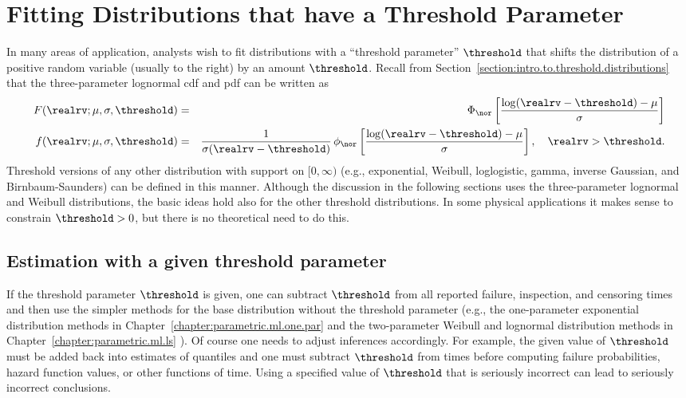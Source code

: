 \section{Fitting Distributions that have a Threshold Parameter}
\label{section:threshold.dist.ml}

In many areas of application, analysts wish to fit distributions with a
``threshold parameter'' $\threshold$ that shifts the distribution of a
positive random variable (usually to the right) by an amount $\threshold$.
Recall from Section~\ref{section:intro.to.threshold.distributions}
that the three-parameter lognormal cdf and pdf can be written as
\begin{eqnarray*}
 	F(\realrv;\mu,\sigma,\threshold)&=&
		\Phi_{\nor}\left [\frac{\log(\realrv-\threshold)-\mu}{\sigma}
		\right ] \\
 f(\realrv;\mu,\sigma,\threshold)&=&	
		\frac{1}{\sigma (\realrv-\threshold)}\, \phi_{\nor}
	\left [ 
	\frac{\log(\realrv-\threshold)-\mu}{\sigma} \right], 
	\quad \realrv> \threshold.
\end{eqnarray*}
Threshold versions of any other distribution with support on
$[0,\infty)$ (e.g., exponential, Weibull, loglogistic,
gamma, inverse Gaussian, and Birnbaum-Saunders) can be defined in
this manner.  Although the discussion in the following sections
uses the three-parameter lognormal and Weibull distributions,
the basic ideas hold also for the other threshold distributions.  In
some physical applications it makes sense to constrain
$\threshold>0$, but there is no theoretical need to do this.
\subsection{Estimation with a given threshold parameter}
If the threshold parameter $\threshold$ is given,
one can subtract $\threshold$ from all reported failure, inspection,
and censoring times and then use the simpler methods for the base
distribution without the threshold parameter (e.g., the one-parameter
exponential distribution methods in
Chapter~\ref{chapter:parametric.ml.one.par} and the two-parameter
Weibull and lognormal distribution methods in
Chapter~\ref{chapter:parametric.ml.ls} ).  Of course one needs to
adjust inferences accordingly. For example, the given value of
$\threshold$ must be added back into estimates of quantiles and one
must subtract $\threshold$ from times before computing failure
probabilities, hazard function values, or other functions of time.
Using a specified value of $\threshold$ that is seriously incorrect
can lead to seriously incorrect conclusions.

